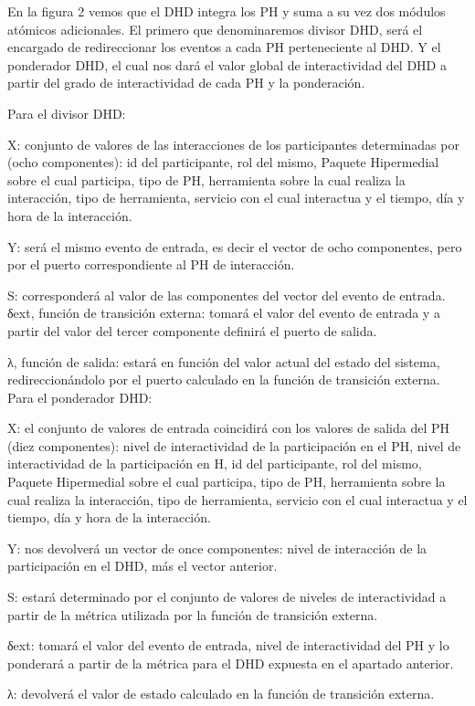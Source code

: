En la figura 2 vemos que el DHD integra los PH y suma a su vez dos módulos atómicos adicionales. El primero que denominaremos divisor DHD, será el encargado de redireccionar los eventos a cada PH perteneciente al DHD. Y el ponderador DHD, el cual nos dará el valor global de interactividad del DHD a partir del grado de interactividad de cada PH y la ponderación.

Para el divisor DHD:

X: conjunto de valores de las interacciones de los participantes determinadas por (ocho componentes): id del participante, rol del mismo, Paquete Hipermedial sobre el cual participa, tipo de PH, herramienta sobre la cual realiza la interacción, tipo de herramienta, servicio con el cual interactua y el tiempo, día y hora de la interacción.

Y: será el mismo evento de entrada, es decir el vector de ocho componentes, pero por el puerto correspondiente al PH de interacción.

S: corresponderá al valor de las componentes del vector del evento de entrada.
δext, función de transición externa: tomará el valor del evento de entrada y a partir del valor del tercer componente definirá el puerto de salida.

λ, función de salida: estará en función del valor actual del estado del sistema, redireccionándolo por el puerto calculado en la función de transición externa.
Para el ponderador DHD:

X: el conjunto de valores de entrada coincidirá con los valores de salida del PH (diez componentes): nivel de interactividad de la participación en el PH, nivel de interactividad de la participación en H, id del participante, rol del mismo, Paquete Hipermedial sobre el cual participa, tipo de PH, herramienta sobre la cual realiza la interacción, tipo de herramienta, servicio con el cual interactua y el tiempo, día y hora de la interacción.

Y: nos devolverá un vector de once componentes: nivel de interacción de la participación en el DHD, más el vector anterior.

S: estará determinado por el conjunto de valores de niveles de interactividad a partir de la métrica utilizada por la función de transición externa. 

δext: tomará el valor del evento de entrada, nivel de interactividad del PH y lo ponderará a partir de la métrica para el DHD expuesta en el apartado anterior.

λ: devolverá el valor de estado calculado en la función de transición externa.



